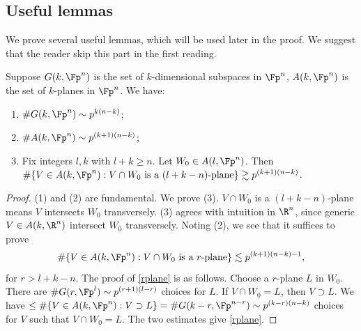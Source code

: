 \subsection{Useful lemmas} We prove several useful lemmas, which will be used later in the proof. We suggest that the reader skip this part in the first reading. 




\begin{lemma} Suppose $G(k,\Fp^n)$ is the set of $k$-dimensional subspaces in $\Fp^n$, $A(k,\Fp^n)$ is the set of $k$-planes in $\Fp^n$. We have: 
\begin{enumerate}
    \item $\#G(k,\Fp^n)\sim p^{k(n-k)}$;
    \item $\# A(k,\Fp^n)\sim p^{(k+1)(n-k)}$;
    \item Fix integers $l,k$ with $l+k\ge n$. Let $W_0\in A(l,\Fp^n)$. Then $\#\{ V\in A(k,\Fp^n): V\cap W_0 \textup{~is~a~}(l+k-n)\textup{-plane} \}\gtrsim p^{(k+1)(n-k)}$.
\end{enumerate}
    
\end{lemma}
\begin{proof}
    (1) and (2) are fundamental.
    We prove (3). $V\cap W_0$ is a $(l+k-n)$-plane means $V$ intersects $W_0$ transversely. (3) agrees with intuition in $\R^n$, since generic $V\in A(k,\R^n)$ intersect $W_0$ transversely. Noting (2), we see that it suffices to prove 
    \begin{equation}\label{rplane}
        \#\{ V\in A(k,\Fp^n): V\cap W_0 \textup{~is~a~}r\textup{-plane} \}\lesssim p^{(k+1)(n-k)-1}, 
    \end{equation} 
    for $r>l+k-n$.
    The proof of \eqref{rplane} is as follows. Choose a $r$-plane $L$ in $W_0$. There are $\#G(r,\Fp^l)\sim p^{(r+1)(l-r)}$ choices for $L$. If $V\cap W_0=L$, then $V\supset L$. We have $\le \#\{V\in A(k,\Fp^n): V\supset L\}=\#G(k-r,\Fp^{n-r})\sim p^{(k-r)(n-k)}$ choices for $V$ such that $V\cap W_0=L$. The two estimates give \eqref{rplane}.
\end{proof}
